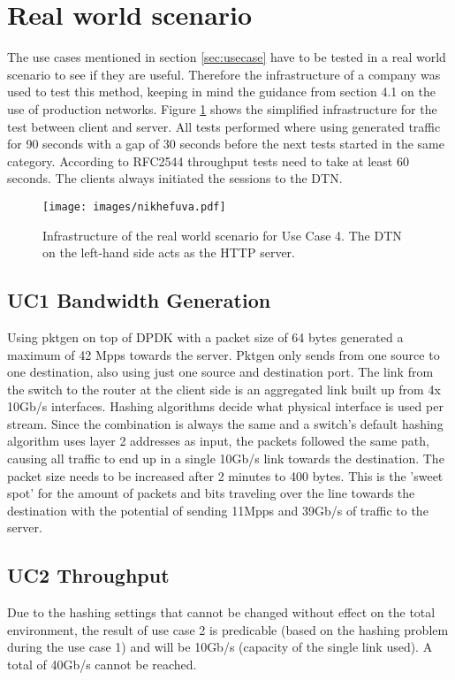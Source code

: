 \section{Real world scenario}
The use cases mentioned in section \ref{sec:usecase} have to be tested in a real world scenario to see if they are useful. Therefore the infrastructure of a company was used to test this method, keeping in mind the guidance from section 4.1 on the use of production networks.
Figure \ref{fig:nikhefuva} shows the simplified infrastructure for the test between client and server. All tests performed where using generated traffic for 90 seconds with a gap of 30 seconds before the next tests started in the same category. According to RFC2544 \cite{rfc2544} throughput tests need to take at least 60 seconds. The clients always initiated the sessions to the DTN.

\begin{figure}
  \texttt{[image: images/nikhefuva.pdf]}
  \caption{Infrastructure of the real world scenario for Use Case 4. The DTN on the left-hand side acts as the HTTP server.}
  \label{fig:nikhefuva}
\end{figure}

\subsection{UC1 Bandwidth Generation}
Using pktgen on top of DPDK with a packet size of 64 bytes generated a maximum of 42 Mpps towards the server. Pktgen only sends from one source to one destination, also using just one source and destination port. The link from the switch to the router at the client side is an aggregated link built up from 4x 10Gb/s interfaces. Hashing algorithms decide what physical interface is used per stream. Since the combination is always the same and a switch's default hashing algorithm uses layer 2 addresses as input, the packets followed the same path, causing all traffic to end up in a single 10Gb/s link towards the destination. The packet size needs to be increased after 2 minutes to 400 bytes. This is the 'sweet spot' for the amount of packets and bits traveling over the line towards the destination with the potential of sending 11Mpps and 39Gb/s of traffic to the server.  

\subsection{UC2 Throughput}
Due to the hashing settings that cannot be changed without effect on the total environment, the result of use case 2 is predicable (based on the hashing problem during the use case 1) and will be 10Gb/s (capacity of the single link used). A total of 40Gb/s cannot be reached.

